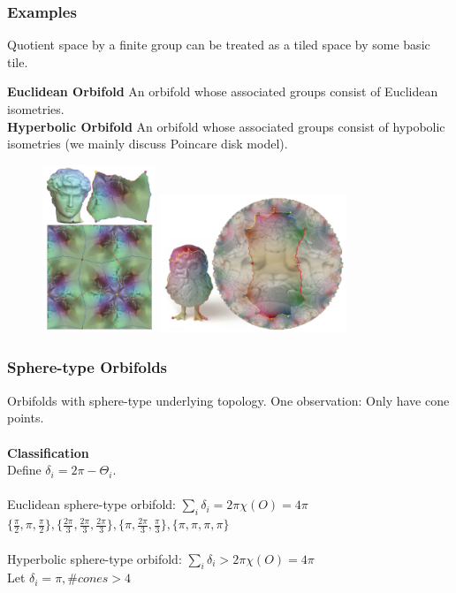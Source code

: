 \documentclass{beamer}
\begin{document}
\begin{frame}
\frametitle{Examples}
Quotient space by a finite group can be treated as a tiled space by some basic tile.

\textbf{Euclidean Orbifold} An orbifold whose associated groups consist of Euclidean isometries.\\
\textbf{Hyperbolic Orbifold} An orbifold whose associated groups consist of hypobolic isometries (we mainly discuss Poincare disk model).
\begin{figure}
\includegraphics[width=0.3\textwidth]{images/euclidean-orbifold.png}
\includegraphics[width=0.5\textwidth]{images/hyperbolic-orbifold.png}
\end{figure}
\end{frame}

\begin{frame}
\frametitle{Sphere-type Orbifolds}
Orbifolds with sphere-type underlying topology. One observation: Only have cone points.\\
~\\
\textbf{Classification}\\
Define $\delta_i = 2\pi - \Theta_i.$\\
~\\ 
Euclidean sphere-type orbifold: $\sum_i \delta_i = 2\pi \chi(\mathit{O}) = 4\pi$\\
$\{\frac{\pi}{2}, \pi, \frac{\pi}{2}\}, \{\frac{2\pi}{3}, \frac{2\pi}{3}, \frac{2\pi}{3}\}, \{\pi, \frac{2\pi}{3}, \frac{\pi}{3}\}, \{\pi, \pi, \pi, \pi\}$\\
~\\
Hyperbolic sphere-type orbifold: $\sum_i \delta_i > 2\pi \chi(\mathit{O}) = 4\pi$\\
Let $\delta_i = \pi, \#cones > 4$
\end{frame}
\end{document}
